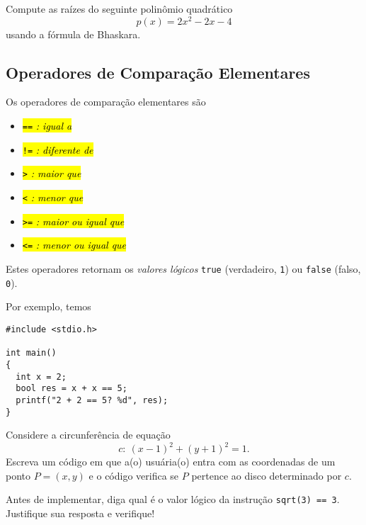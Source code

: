 \documentclass[12pt]{article}
\begin{document}
\begin{exr}\label{exr:bhaskara}
  Compute as raízes do seguinte polinômio quadrático
  \begin{equation}
    p(x) = 2x^2 - 2x - 4
  \end{equation}
  usando a fórmula de Bhaskara{\bhaskara}.
\end{exr}

\subsection{Operadores de Comparação Elementares}

Os operadores de comparação elementares são
\begin{itemize}
\item[]\hl{{\lstinline+==+} \emph{: igual a}}
\item[]\hl{{\lstinline+!=+} \emph{: diferente de}}
\item[]\hl{{\lstinline+>+} \emph{: maior que}}
\item[]\hl{{\lstinline+<+} \emph{: menor que}}
\item[]\hl{{\lstinline+>=+} \emph{: maior ou igual que}}
\item[]\hl{{\lstinline+<=+} \emph{: menor ou igual que}}
\end{itemize}
Estes operadores retornam os \emph{valores lógicos} \lstinline!true! (verdadeiro, \lstinline!1!) ou \lstinline!false! (falso, \lstinline!0!).

Por exemplo, temos
\begin{lstlisting}[caption=opComp.cc]
#include <stdio.h>

int main()
{
  int x = 2;
  bool res = x + x == 5;
  printf("2 + 2 == 5? %d", res);
}
\end{lstlisting}

\begin{exr}
  Considere a circunferência de equação
  \begin{equation}
    c: ~(x - 1)^2 + (y + 1)^2 = 1.
  \end{equation}
  Escreva um código em que a(o) usuária(o) entra com as coordenadas de um ponto $P = (x, y)$ e o código verifica se $P$ pertence ao disco determinado por $c$.
\end{exr}

\begin{exr}
  Antes de implementar, diga qual é o valor lógico da instrução \lstinline+sqrt(3) == 3+. Justifique sua resposta e verifique!
\end{exr}
\end{document}
